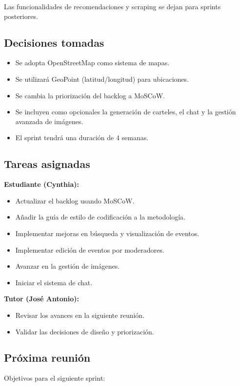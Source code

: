 Las funcionalidades de recomendaciones y scraping se dejan para sprints posteriores.

\subsection*{Decisiones tomadas}
\begin{itemize}
    \item Se adopta OpenStreetMap como sistema de mapas.
    \item Se utilizará GeoPoint (latitud/longitud) para ubicaciones.
    \item Se cambia la priorización del backlog a MoSCoW.
    \item Se incluyen como opcionales la generación de carteles, el chat y la gestión avanzada de imágenes.
    \item El sprint tendrá una duración de 4 semanas.
\end{itemize}

\subsection*{Tareas asignadas}

\textbf{Estudiante (Cynthia):}
\begin{itemize}
    \item Actualizar el backlog usando MoSCoW.
    \item Añadir la guía de estilo de codificación a la metodología.
    \item Implementar mejoras en búsqueda y visualización de eventos.
    \item Implementar edición de eventos por moderadores.
    \item Avanzar en la gestión de imágenes.
    \item Iniciar el sistema de chat.
\end{itemize}

\textbf{Tutor (José Antonio):}
\begin{itemize}
    \item Revisar los avances en la siguiente reunión.
    \item Validar las decisiones de diseño y priorización.
\end{itemize}

\subsection*{Próxima reunión}
Objetivos para el siguiente sprint:

